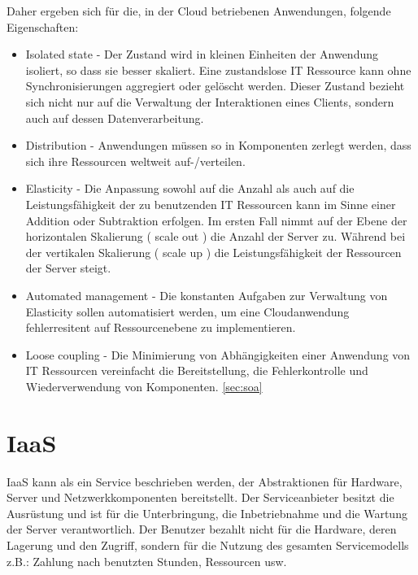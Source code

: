 \documentclass[
12pt,
english,
ngerman,
headsepline,
twoside,
openright,
numbers=noenddot,version=first
]{scrreprt}
\begin{document}
Daher ergeben sich für die, in der Cloud betriebenen Anwendungen, folgende Eigenschaften: 
\begin{itemize}
	\item Isolated state - Der Zustand wird in kleinen Einheiten der Anwendung isoliert, so dass sie besser skaliert. Eine zustandslose IT Ressource kann ohne Synchronisierungen aggregiert oder gelöscht werden. Dieser Zustand bezieht sich nicht nur auf die Verwaltung der Interaktionen eines Clients, sondern auch auf dessen Datenverarbeitung. 
	\item Distribution - Anwendungen müssen so in Komponenten zerlegt werden, dass sich ihre Ressourcen weltweit auf-/verteilen.
	\item Elasticity\label{app-char:elascitity} - Die Anpassung sowohl auf die Anzahl als auch auf die Leistungsfähigkeit der zu benutzenden IT Ressourcen kann im Sinne einer Addition oder Subtraktion erfolgen. Im ersten Fall nimmt auf der Ebene der horizontalen Skalierung ( scale out ) die Anzahl der Server zu. Während bei der vertikalen Skalierung ( scale up ) die Leistungsfähigkeit der Ressourcen der Server steigt.
	\item Automated management - Die konstanten Aufgaben zur Verwaltung von Elasticity sollen automatisiert werden, um eine Cloudanwendung fehlerresitent auf Ressourcenebene zu implementieren.
	\item Loose coupling - Die Minimierung von Abhängigkeiten einer Anwendung von IT Ressourcen vereinfacht die Bereitstellung, die Fehlerkontrolle und Wiederverwendung von Komponenten. \autoref{sec:soa} \cite{cloudEssentials}
\end{itemize}


\section{IaaS}
\label{sec:iaas}
\acrfull{IaaS} kann als ein Service beschrieben werden, der Abstraktionen für Hardware, Server und Netzwerkkomponenten bereitstellt. Der Serviceanbieter besitzt die Ausrüstung und ist für die Unterbringung, die Inbetriebnahme und die Wartung der Server verantwortlich\cite{patternAWS}. Der Benutzer bezahlt nicht für die Hardware, deren Lagerung und den Zugriff, sondern für die Nutzung des gesamten Servicemodells z.B.: Zahlung nach benutzten Stunden, Ressourcen usw.
\end{document}
